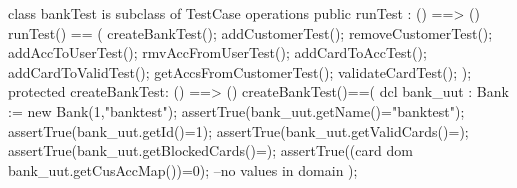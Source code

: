 \documentclass[a4paper]{article}
\begin{document}
\title{}
\author{}
\begin{vdm_al}

class bankTest is subclass of TestCase
operations
    public runTest : () ==> ()
    runTest() == (
        createBankTest();
        addCustomerTest();
        removeCustomerTest();
        addAccToUserTest();
        rmvAccFromUserTest();
        addCardToAccTest();
        addCardToValidTest();
        getAccsFromCustomerTest();
        validateCardTest();
    );
    protected createBankTest: () ==> ()
    createBankTest()==(
        dcl bank_uut : Bank := new Bank(1,"banktest");
        assertTrue(bank_uut.getName()="banktest");
        assertTrue(bank_uut.getId()=1);
        assertTrue(bank_uut.getValidCards()={});
        assertTrue(bank_uut.getBlockedCards()={});
        assertTrue((card dom bank_uut.getCusAccMap())=0); --no values in domain
    );
    

\end{vdm_al}
\end{document}
